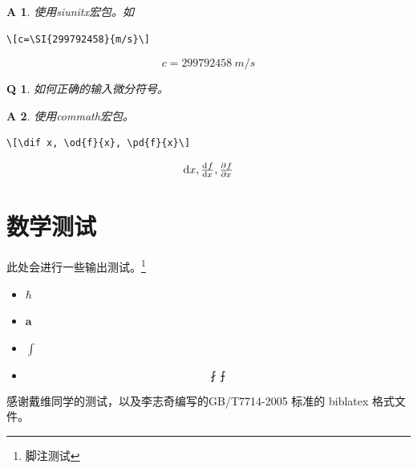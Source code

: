 \documentclass{LZU}
\newcommand{\bvec}[1]{\symbf{#1}}
\newcommand{\package}[1]{{\sffamily #1}}
\newtheorem*{answer}{A}
\newtheorem{question}{Q}
\begin{document}
\begin{answer}
    使用\package{siunitx}宏包。如
\begin{verbatim}
\[c=\SI{299792458}{m/s}\]
\end{verbatim}
    \[c=\SI{299792458}{m/s}\]
\end{answer}
\begin{question}
    如何正确的输入微分符号。
\end{question}
\begin{answer}
    使用\package{commath}宏包。
\begin{verbatim}
\[\dif x, \od{f}{x}, \pd{f}{x}\]
\end{verbatim}
    \[\dif x, \od{f}{x}, \pd{f}{x}\]
\end{answer}
\section{数学测试}
此处会进行一些输出测试。\footnote{脚注测试}
\begin{itemize}
    \item $\hbar$
    \item $\bvec{a}$
    \item $\int$
    \item \[\fint\intbar\]
\end{itemize}
\Thanks
感谢戴维同学的测试，以及李志奇编写的GB/T7714-2005 标准的 biblatex 格式文件。
\Grade
\end{document}
